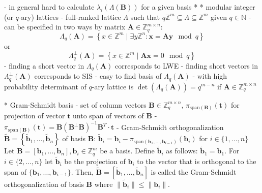 \documentclass[
  a4paper,  %
  twoside,  %
  bibliography=totoc,
  headsepline,
  cleardoublepage=empty,
  parskip=half,
  draft=false
]{scrbook}
\begin{document}
    - in general hard to calculate $\lambda_i(\Lambda(\textbf{B}))$ for a given basis  
  * 
  * modular integer (or $q$-ary) lattices %
    - full-ranked lattice $\Lambda$ such that $q\mathbb{Z}^m \subseteq	\Lambda \subseteq	\mathbb{Z}^m$ given $q \in \mathbb{N}$
    - can be specified in two ways by matrix $\textbf{A} \in \mathbb{Z}_q^{m\times n}$:
    \begin{equation}
      \Lambda_q(\textbf{A}) = \left\{ x \in \mathbb{Z}^m \mid \exists y \mathbb{Z}^n : \textbf{x} = \textbf{A}\textbf{y} \mod q \right\}
    \end{equation}
    or
    \begin{equation}
      \Lambda_q^\perp(\textbf{A}) = \left\{ x \in \mathbb{Z}^m \mid  \textbf{A}\textbf{x} = 0 \mod q \right\}
    \end{equation}
    - finding a short vector in $\Lambda_q(\textbf{A})$ corresponds to LWE %
    - finding short vectors in $\Lambda_q^\perp(\textbf{A})$ corresponds to SIS %
    - easy to find basis of $\Lambda_q(\textbf{A})$ \cite{AFG13}
    - with high probability determinant of $q$-ary lattice is $\det(\Lambda_q(\textbf{A}))=q^{m-n}$ if $\textbf{A} \in \mathbb{Z}_q^{m\times n}$

  * Gram-Schmidt basis
    - set of column vectors $\textbf{B} \in \mathbb{Z}_q^{m\times n}$, $\pi_{\text{span}(\textbf{B})}(\textbf{t})$ for projection of vector $\textbf{t}$ unto span of vectors of $\textbf{B}$
    - $\pi_{\text{span}(\textbf{B})}(\textbf{t}) = \textbf{B}(\textbf{B}^\perp \textbf{B})^{-1}\textbf{B}^T \cdot \textbf{t}$
    - Gram-Schmidt orthogonalization $\tilde{\textbf{B}} = \left\{\tilde{\textbf{b}}_1, ..., \tilde{\textbf{b}}_n\right\}$ of basis $\textbf{B}$: $\tilde{\textbf{b}}_i = \textbf{b}_i - \pi_{\text{span}(\textbf{b}_1, ..., \textbf{b}_{i-1})}(\textbf{b}_i)$ for $i \in \{1, ..., n\}$ 
    Let $\textbf{B} = \left[\textbf{b}_1, ..., \textbf{b}_n\right], \textbf{b}_i \in \mathbb{Z}_q^{m}$ be a basis. Define $\tilde{\textbf{b}}_i$ as follows: $\tilde{\textbf{b}}_1 = \textbf{b}_1$. For $i \in \{2, ..., n\}$ let $\tilde{\textbf{b}}_i$ be the projection of $\textbf{b}_i$ to the vector that is orthogonal to the span of $\{\textbf{b}_1, ..., \textbf{b}_{i-1}\}$. Then,  $\tilde{\textbf{B}} = \left[\tilde{\textbf{b}}_1, ..., \tilde{\textbf{b}}_n\right]$ is called the Gram-Schmidt orthogonalization of basis $\textbf{B}$ where $\| \tilde{\textbf{b}}_i\| \leq \| \textbf{b}_i\|$. 
\end{document}
